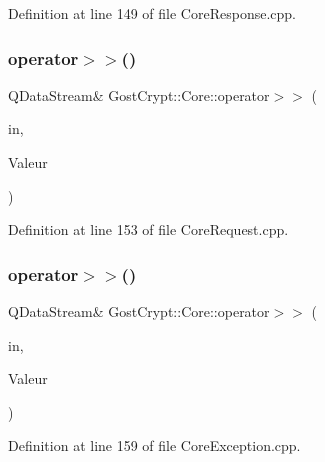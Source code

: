 Definition at line 149 of file Core\+Response.\+cpp.

\mbox{\label{namespace_gost_crypt_1_1_core_a5209c2348a9e16fc9e9c5177101b07f5}} 
\subsubsection{\texorpdfstring{operator$>$$>$()}{operator>>()}\hspace{0.1cm}{\footnotesize\ttfamily [24/56]}}
{\footnotesize\ttfamily Q\+Data\+Stream\& Gost\+Crypt\+::\+Core\+::operator$>$$>$ (\begin{DoxyParamCaption}\item[{Q\+Data\+Stream \&}]{in,  }\item[{\hyperlink{struct_gost_crypt_1_1_core_1_1_mount_volume_request}{Mount\+Volume\+Request} \&}]{Valeur }\end{DoxyParamCaption})}



Definition at line 153 of file Core\+Request.\+cpp.

\mbox{\label{namespace_gost_crypt_1_1_core_aa87f49503f1e38c17137e4914000b2f6}} 
\subsubsection{\texorpdfstring{operator$>$$>$()}{operator>>()}\hspace{0.1cm}{\footnotesize\ttfamily [25/56]}}
{\footnotesize\ttfamily Q\+Data\+Stream\& Gost\+Crypt\+::\+Core\+::operator$>$$>$ (\begin{DoxyParamCaption}\item[{Q\+Data\+Stream \&}]{in,  }\item[{\hyperlink{class_gost_crypt_1_1_core_1_1_fail_unmount_filesystem}{Gost\+Crypt\+::\+Core\+::\+Fail\+Unmount\+Filesystem} \&}]{Valeur }\end{DoxyParamCaption})}



Definition at line 159 of file Core\+Exception.\+cpp.

